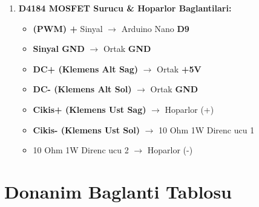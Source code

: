 \documentclass[12pt,a4paper]{article}
\begin{document}
\begin{enumerate}
    \item \textbf{D4184 MOSFET Surucu \& Hoparlor Baglantilari:}
    \begin{itemize}
        \item \textbf{(PWM) +} Sinyal $\rightarrow$ Arduino Nano \textbf{D9}
        \item \textbf{Sinyal GND} $\rightarrow$ Ortak \textbf{GND}
        \item \textbf{DC+ (Klemens Alt Sag)} $\rightarrow$ Ortak \textbf{+5V}
        \item \textbf{DC- (Klemens Alt Sol)} $\rightarrow$ Ortak \textbf{GND}
        \item \textbf{Cikis+ (Klemens Ust Sag)} $\rightarrow$ Hoparlor (+)
        \item \textbf{Cikis- (Klemens Ust Sol)} $\rightarrow$ 10 Ohm 1W Direnc ucu 1
        \item 10 Ohm 1W Direnc ucu 2 $\rightarrow$ Hoparlor (-)
    \end{itemize}
\end{enumerate}

\newpage
\section{Donanim Baglanti Tablosu}
\end{document}
